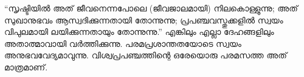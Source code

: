 “സൃഷ്ടിയില്‍ അത് ജീവനെന്നപോലെ (ജീവജാലമായി) നിലകൊള്ളുന്നു; അത് സുഖാനുഭവം ആസ്വദിക്കുന്നതായി തോന്നുന്നു; പ്രപഞ്ചവസ്തുക്കളില്‍ സ്വയം വിപുലമായി ലയിക്കുന്നതായും തോന്നുന്നു.” എങ്കിലും എല്ലാ ദേഹങ്ങളിലും അതാത്മാവായി വര്‍ത്തിക്കുന്നു. പരമപ്രശാന്തതയോടെ സ്വയം അനുഭവവേദ്യമാവുന്നു. വിശ്വപ്രപഞ്ചത്തിന്റെ ഒരേയൊരു പരമസത്ത അത് മാത്രമാണ്.